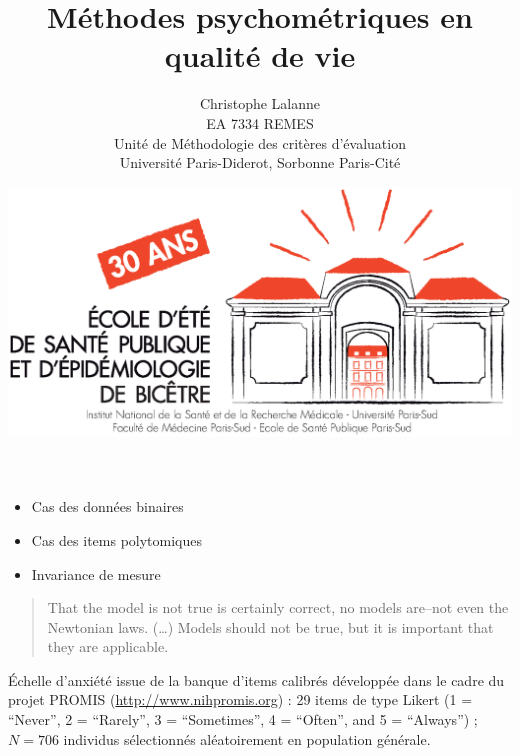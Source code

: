 

\title{Méthodes psychométriques en qualité de vie}
\author{Christophe Lalanne\\EA 7334 REMES\\ Unité de Méthodologie des critères d’évaluation\\Université Paris-Diderot, Sorbonne Paris-Cité\\}
\date{\includegraphics[height=18ex]{logo.eps}}




\LogoOff
\maketitle
\rightfooter{\quad\textsf{\thepage}}



\begin{itemize}
\item Cas des données binaires
\item Cas des items polytomiques
\item Invariance de mesure
\end{itemize}



\foilhead{}

\begin{quote}
That the model is not true is certainly correct,
no models are--not even the Newtonian laws. (\dots) Models should
not be true, but it is important that they are applicable\autocite{rasch60}.  
\end{quote}


Échelle d'anxiété issue de la banque d'items calibrés développée dans le cadre
du projet PROMIS (\url{http://www.nihpromis.org}) : 29 items de type Likert (1 =
\enquote{Never}, 2 = \enquote{Rarely}, 3 = \enquote{Sometimes}, 4 =
\enquote{Often}, and 5 = \enquote{Always}) ; $N=706$ individus sélectionnés
aléatoirement en population générale\autocite{Pilkonis2011,Choi2011}.


